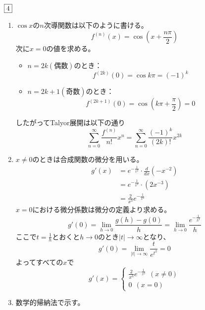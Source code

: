 \documentclass[dvipdfmx]{jsreport}
\begin{document}
\begin{souanswer} %
	$\fbox{4}$
\begin{enumerate}
	\item $\cos{x}$の$n$次導関数は以下のように書ける。
\begin{equation*}
	f^{(n)}(x)= \cos{\left(x+ \frac{n\pi}{2}\right)}
\end{equation*}
	次に$x= 0$の値を求める。
\begin{itemize}
	\item $n= 2k(偶数)$のとき：
\begin{equation*}
	f^{(2k)}(0)= \cos{k\pi}= (-1)^k
\end{equation*}
 
	\item $n= 2k+ 1(奇数)$のとき：
\begin{equation*}
	f^{(2k+ 1)}(0)= \cos{\left(k\pi+ \frac{\pi}{2}\right)}= 0
\end{equation*}
\end{itemize}
	したがってTalyor展開は以下の通り
\begin{equation*}
	\sum_{n= 0}^\infty \frac{f^{(n)}}{n!}x^n= \sum_{n= 0}^\infty \frac{(-1)^k}{(2k)!}x^{2k}
\end{equation*}

	\item $x\ne 0$のときは合成関数の微分を用いる。
\begin{align*}
	g'(x)
	&= e^{-\frac{1}{x^2}}\cdot \frac{d}{dx}(-x^{-2})\\
	&= e^{-\frac{1}{x^2}}\cdot (2x^{-3})\\
	&= \frac{2}{x^3}e^{-\frac{1}{x^2}}
\end{align*}
	$x= 0$における微分係数は微分の定義より求める。
\begin{equation*}
	g'(0)= \lim_{h\to 0}\frac{g(h)- g(0)}{h}= \lim_{h\to 0} \frac{e^{-\frac{1}{h^2}}}{h}
\end{equation*}
	ここで$t= \frac{1}{h}$とおくと$h\to 0$のとき$|t|\to \infty$となり、
\begin{equation*}
	g'(0)= \lim_{|t|\to \infty} \frac{t}{e^{t^2}}= 0
\end{equation*}
	よってすべての$x$で
\begin{equation*}
	g'(x)= 
\begin{cases}
	\frac{2}{x^3}e^{-\frac{1}{x^2}}\ \ (x\ne 0)\\
0\ \ (x= 0)
\end{cases}
\end{equation*}
	\item\label{step:R7-2nd数学的帰納法} 数学的帰納法で示す。
\end{enumerate}
\end{souanswer}
\end{document}
